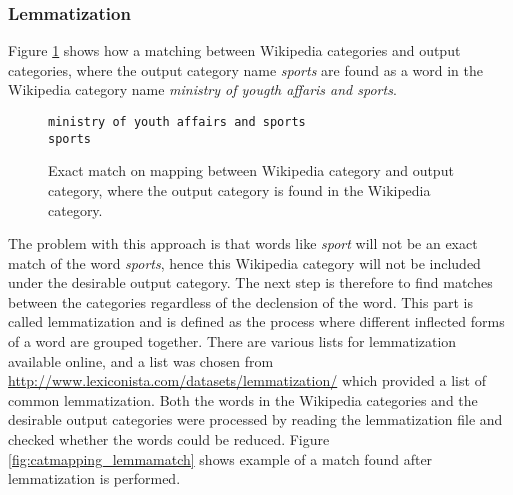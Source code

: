 



\subsubsection{Lemmatization}

Figure \ref{fig:catmapping_exactmatch} shows how a matching between Wikipedia categories and output categories, where the output category name \emph{sports} are found as a word in the Wikipedia category name \emph{ministry of yougth affaris and sports}.

\begin{figure}[h]
\centering
\begin{lstlisting}
ministry of youth affairs and sports
sports
\end{lstlisting}
\caption[Exact match on mapping between Wikipedia category and output category]{Exact match on mapping between Wikipedia category and output category, where the output category is found in the Wikipedia category.}
\label{fig:catmapping_exactmatch}
\end{figure}
The problem with this approach is that words like \emph{sport} will not be an exact match of the word \emph{sports}, hence this Wikipedia category will not be included under the desirable output category. The next step is therefore to find matches between the categories regardless of the declension of the word. This part is called lemmatization and is defined as the process where different inflected forms of a word are grouped together.\cite{wiki:lemmatisation} There are various lists for lemmatization available online, and a list was chosen from  \url{http://www.lexiconista.com/datasets/lemmatization/} which provided a list of common lemmatization. Both the words in the Wikipedia categories and the desirable output categories were processed by reading the lemmatization file and checked whether the words could be reduced. Figure \ref{fig:catmapping_lemmamatch} shows example of a match found after lemmatization is performed. 

